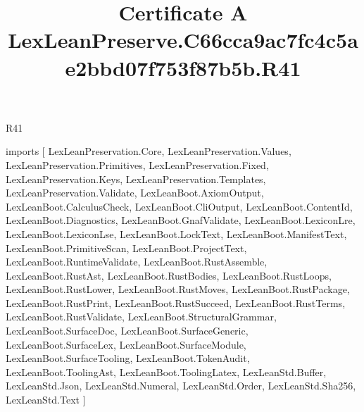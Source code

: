 \begin{lexlean}{R41}
\title{Certificate A LexLeanPreserve.C66cca9ac7fc4c5ae2bbd07f753f87b5b.R41}
\begin{coremodule}
imports [
  LexLeanPreservation.Core,
  LexLeanPreservation.Values,
  LexLeanPreservation.Primitives,
  LexLeanPreservation.Fixed,
  LexLeanPreservation.Keys,
  LexLeanPreservation.Templates,
  LexLeanPreservation.Validate,
  LexLeanBoot.AxiomOutput,
  LexLeanBoot.CalculusCheck,
  LexLeanBoot.CliOutput,
  LexLeanBoot.ContentId,
  LexLeanBoot.Diagnostics,
  LexLeanBoot.GnafValidate,
  LexLeanBoot.LexiconLre,
  LexLeanBoot.LexiconLse,
  LexLeanBoot.LockText,
  LexLeanBoot.ManifestText,
  LexLeanBoot.PrimitiveScan,
  LexLeanBoot.ProjectText,
  LexLeanBoot.RuntimeValidate,
  LexLeanBoot.RustAssemble,
  LexLeanBoot.RustAst,
  LexLeanBoot.RustBodies,
  LexLeanBoot.RustLoops,
  LexLeanBoot.RustLower,
  LexLeanBoot.RustMoves,
  LexLeanBoot.RustPackage,
  LexLeanBoot.RustPrint,
  LexLeanBoot.RustSucceed,
  LexLeanBoot.RustTerms,
  LexLeanBoot.RustValidate,
  LexLeanBoot.StructuralGrammar,
  LexLeanBoot.SurfaceDoc,
  LexLeanBoot.SurfaceGeneric,
  LexLeanBoot.SurfaceLex,
  LexLeanBoot.SurfaceModule,
  LexLeanBoot.SurfaceTooling,
  LexLeanBoot.TokenAudit,
  LexLeanBoot.ToolingAst,
  LexLeanBoot.ToolingLatex,
  LexLeanStd.Buffer,
  LexLeanStd.Json,
  LexLeanStd.Numeral,
  LexLeanStd.Order,
  LexLeanStd.Sha256,
  LexLeanStd.Text
]


\end{coremodule}
\end{lexlean}
